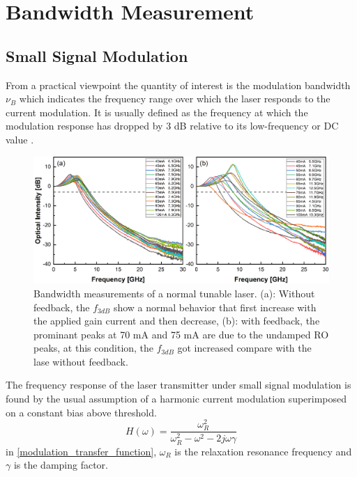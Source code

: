 \section{Bandwidth Measurement}\label{sec:bandwidth_measurement}
\subsection{Small Signal Modulation}
From a practical viewpoint the quantity of interest is the modulation bandwidth $\nu_B$ which indicates the frequency range over which the laser responds to the current modulation. It is usually defined as the frequency at which the modulation response has dropped by 3 dB relative to its low-frequency or DC value \cite{agrawal2013semiconductor}.
\begin{figure}[ht]
    \centering
    \includegraphics[width=\linewidth]{figures/bandwidth_gain_scan_cleaved_and_lensed_grating_4679.png}
    \caption{Bandwidth measurements of a normal tunable laser. (a): Without feedback, the $f_{3dB}$ show a normal behavior that first increase with the applied gain current and then decrease, (b): with feedback, the prominant peaks at 70 mA and 75 mA are due to the undamped RO peaks, at this condition, the $f_{3dB}$ got increased compare with the lase without feedback.}
    \label{fig:bandwidth_gain_scan_cleaved_and_lensed}
\end{figure}

The frequency response of the laser transmitter under small signal modulation is found by the usual assumption of a harmonic current modulation superimposed on a constant bias above threshold.
\begin{equation}
    H(\omega)=\frac{\omega_R^2}{\omega_R^2-\omega^2-2j\omega\gamma}
    \label{modulation_transfer_function}
\end{equation}
in \autoref{modulation_transfer_function}, $\omega_R$ is the relaxation resonance frequency and $\gamma$ is the damping factor.

